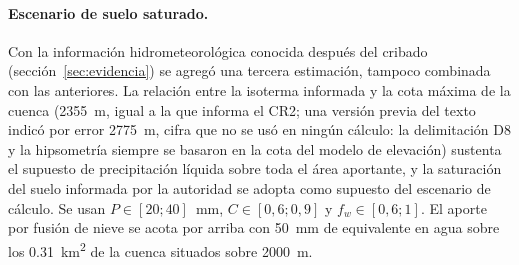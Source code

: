 \paragraph{Escenario de suelo saturado.} Con la información hidrometeorológica conocida después del cribado (sección~\ref{sec:evidencia}) se agregó una tercera estimación, tampoco combinada con las anteriores. La relación entre la isoterma informada y la cota máxima de la cuenca (\SI{2355}{m}, igual a la que informa el CR2; una versión previa del texto indicó por error \SI{2775}{m}, cifra que no se usó en ningún cálculo: la delimitación D8 y la hipsometría siempre se basaron en la cota del modelo de elevación) sustenta el supuesto de precipitación líquida sobre toda el área aportante, y la saturación del suelo informada por la autoridad se adopta como supuesto del escenario de cálculo. Se usan $P\in[20;40]$~\si{mm}, $C\in[0{,}6;0{,}9]$ y $f_w\in[0{,}6;1]$. El aporte por fusión de nieve se acota por arriba con \SI{50}{mm} de equivalente en agua sobre los \SI{0,31}{km^2} de la cuenca situados sobre \SI{2000}{m}.

